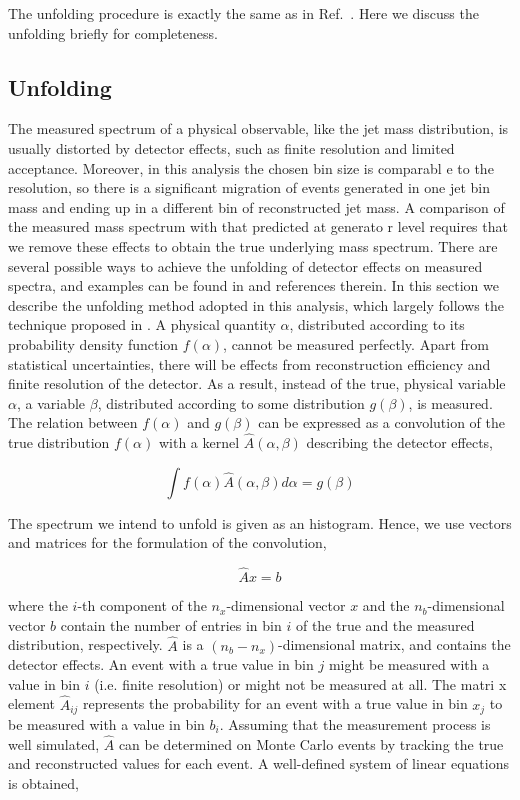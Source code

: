 The unfolding procedure is exactly the same as in Ref.~\cite{cmsSMPJSVJ}. Here we discuss the unfolding
briefly for completeness. 

\subsection{Unfolding}
The measured spectrum of a physical observable, like the jet mass distribution, is usually distorted by	detector effects, such as finite resolution and limited acceptance. Moreover, in this analysis the chosen bin size is comparabl
e to the resolution, so there is a significant migration of events generated in one jet bin mass and ending up in a different bin of reconstructed jet mass. A comparison of the measured mass spectrum with that predicted at generato
r level requires that we remove these effects to obtain the true underlying mass spectrum. There are several possible ways to achieve the unfolding of detector effects on measured spectra, and examples can be found in \cite{unfold}
 and references therein. In this section we describe the unfolding method adopted in this analysis, which largely follows the technique proposed in \cite{agostini}. 
A physical quantity $\alpha$, distributed according to its probability density function $f(\alpha)$, cannot be measured perfectly. Apart from statistical uncertainties, there will be effects from reconstruction efficiency and finite 
resolution of the detector. As	a result, instead of the true, physical variable $\alpha$, 
a variable $\beta$, distributed according to some distribution $g(\beta)$, is measured. 
The relation between $f(\alpha)$ and $g(\beta)$ can be expressed as a convolution of the 
true distribution $f(\alpha)$ with a kernel $\hat{A}(\alpha,\beta)$ describing the detector effects,

\begin{equation}
\int f(\alpha) \hat{A}(\alpha,\beta)d\alpha = g(\beta)
\end{equation}

\noindent The spectrum we intend to unfold is given as an histogram. Hence, we use vectors and matrices for the formulation of the convolution,	

\begin{equation}
\hat{A} x = b
\label{eq:unf1}
\end{equation}

\noindent where the $i$-th component of the $n_x$-dimensional vector $x$ and the $n_b$-dimensional vector $b$ contain the number of entries in bin $i$ of the true and the measured distribution, respectively. 
$\hat{A}$ is a $(n_b - n_x)$-dimensional matrix, and contains the detector effects. An event with a true value in bin $j$ might be measured with a value in bin $i$ (i.e. finite resolution) or might not be measured at all. The matri
x element $\hat{A}_{ij}$ represents the probability for an event	 with a true value in bin $x_j$ to be measured with a value in bin $b_i$.
Assuming that the measurement process is well simulated, $\hat{A}$ can be determined on Monte Carlo events by tracking the true and reconstructed values for each event. A well-defined system of linear equations is obtained,

